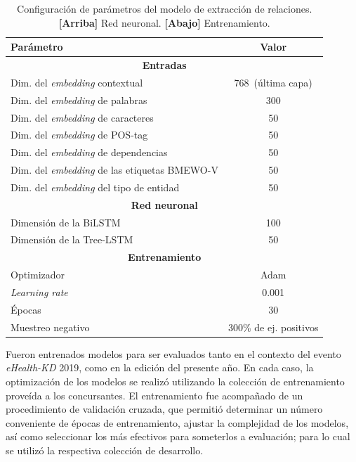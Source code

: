 \begin{table}[tb]\centering
	\begin{tabular}{lc}
		\hline
		\textbf{Parámetro} & \textbf{Valor} \\
		\hline
		\hline
		\multicolumn{2}{c}{\textbf{Entradas}}\\
		\hline
		\hline
		Dim. del \textit{embedding} contextual & 768~(última capa)\\
		Dim. del \textit{embedding} de palabras & 300\\
		Dim. del \textit{embedding} de caracteres & 50\\
		Dim. del \textit{embedding} de POS-tag & 50\\
		Dim. del \textit{embedding} de dependencias & 50\\
		Dim. del \textit{embedding} de las etiquetas BMEWO-V & 50\\
		Dim. del \textit{embedding} del tipo de entidad & 50\\
		
		\hline
		\hline
		\multicolumn{2}{c}{\textbf{Red neuronal}}\\
		\hline
		\hline
		
		Dimensión de la BiLSTM & 100\\
		Dimensión de la Tree-LSTM & 50\\
		
		\hline
		\hline
		\multicolumn{2}{c}{\textbf{Entrenamiento}}\\
		\hline
		\hline
		
		Optimizador & Adam\\
		\textit{Learning rate} & 0.001\\
		Épocas & 30\\
		Muestreo negativo & 300\% de ej. positivos\\
		
		\hline
		
	\end{tabular}
	
	\caption{Configuración de parámetros del modelo de extracción de relaciones. \textbf{[Arriba]} Red neuronal. \textbf{[Abajo]} Entrenamiento.}\label{table:params_taskB}
	
\end{table}
		
Fueron entrenados modelos para ser evaluados tanto en el contexto del evento \textit{eHealth-KD} 2019, como en la edición del presente año.
En cada caso, la optimización de los modelos se realizó utilizando la colección de entrenamiento proveída a los concursantes.
El entrenamiento fue acompañado de un procedimiento de validación cruzada, que permitió determinar un número conveniente de épocas de entrenamiento, ajustar la complejidad de los modelos, así como seleccionar los más efectivos para someterlos a evaluación; para lo cual se utilizó la respectiva colección de desarrollo.


